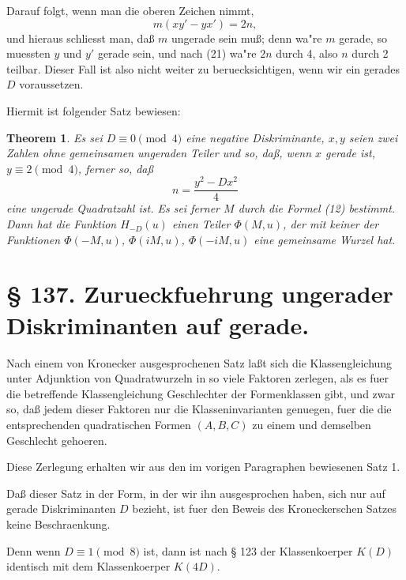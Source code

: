 \documentclass[12pt,a4paper]{article}
\theoremstyle{plain}
\newtheorem{theorem}{Theorem}[section]
\theoremstyle{definition}
\theoremstyle{remark}
\begin{document}
Darauf folgt, wenn man die oberen Zeichen nimmt,
\begin{equation}\label{eq:136_21}
m(xy' - yx') = 2n,
\end{equation}
und hieraus schliesst man, da\ss{} $m$ ungerade sein mu\ss{}; denn wa"re $m$ gerade, so muessten $y$ und $y'$ gerade sein, und nach (21) wa"re $2n$ durch 4, also $n$ durch 2 teilbar. Dieser Fall ist also nicht weiter zu beruecksichtigen, wenn wir ein gerades $D$ voraussetzen.

Hiermit ist folgender Satz bewiesen:

\begin{theorem}
Es sei $D \equiv 0 \pmod{4}$ eine negative Diskriminante, $x, y$ seien zwei Zahlen ohne gemeinsamen ungeraden Teiler und so, da\ss{}, wenn $x$ gerade ist, $y \equiv 2 \pmod{4}$, ferner so, da\ss{}
\[
n = \frac{y^2 - Dx^2}{4}
\]
eine ungerade Quadratzahl ist. Es sei ferner $M$ durch die Formel (12) bestimmt. Dann hat die Funktion $H_{-D}(u)$ einen Teiler $\Phi(M, u)$, der mit keiner der Funktionen $\Phi(-M, u)$, $\Phi(iM, u)$, $\Phi(-iM, u)$ eine gemeinsame Wurzel hat.
\end{theorem}

\newpage

\section*{\S{} 137. Zurueckfuehrung ungerader Diskriminanten auf gerade.}

Nach einem von Kronecker ausgesprochenen Satz la\ss{}t sich die Klassengleichung unter Adjunktion von Quadratwurzeln in so viele Faktoren zerlegen, als es fuer die betreffende Klassengleichung Geschlechter der Formenklassen gibt, und zwar so, da\ss{} jedem dieser Faktoren nur die Klasseninvarianten genuegen, fuer die die entsprechenden quadratischen Formen $(A, B, C)$ zu einem und demselben Geschlecht gehoeren.

Diese Zerlegung erhalten wir aus den im vorigen Paragraphen bewiesenen Satz 1.

Da\ss{} dieser Satz in der Form, in der wir ihn ausgesprochen haben, sich nur auf gerade Diskriminanten $D$ bezieht, ist fuer den Beweis des Kroneckerschen Satzes keine Beschraenkung.

Denn wenn $D \equiv 1 \pmod{8}$ ist, dann ist nach \S{} 123 der Klassenkoerper $K(D)$ identisch mit dem Klassenkoerper $K(4D)$.
\end{document}
